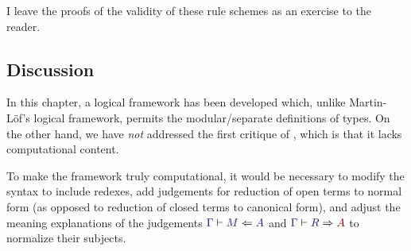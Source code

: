 \documentclass[main.tex]{subfiles}
\begin{document}
I leave the proofs of the validity of these rule schemes as an
exercise to the reader.

\subsection{Discussion}

In this chapter, a logical framework has been developed which, unlike
Martin-L\"of's logical framework, permits the modular/separate
definitions of types. On the other hand, we have \emph{not} addressed
the first critique of \MLLF, which is that it lacks computational
content.

To make the framework truly computational, it would be necessary to
modify the syntax to include redexes, add judgements for reduction of
open terms to normal form (as opposed to reduction of closed terms to
canonical form), and adjust the meaning explanations of the judgements
$\lfsequent\Gamma\checks{M}{A}$ and $\lfsequent\Gamma\infers{R}{A}$ to
normalize their subjects.
\end{document}
